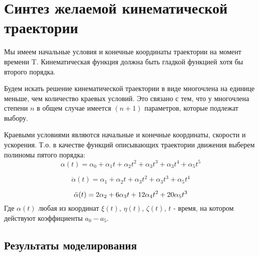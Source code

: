 \section{Синтез желаемой кинематической траектории}

Мы имеем начальные условия и конечные координаты траектории на момент времени T. Кинематическая функция должна быть гладкой функцией хотя бы второго порядка.

Будем искать решение кинематической траектории в виде многочлена на единице меньше, чем количество краевых условий. Это связано с тем, что у многочлена степени $n$ в общем случае имеется $(n + 1)$ параметров, которые подлежат выбору. 

Краевыми условиями являются начальные и конечные координаты, скорости и ускорения. Т.о. в качестве функций описывающих траектории движения выберем полиномы пятого порядка:
\begin{equation}
\alpha(t) = \alpha_0 + \alpha_1 t + \alpha_2 t^2 + \alpha_3 t^3 + \alpha_3 t^4 + \alpha_5 t^5 
\label{eq:ur_traectorii}
\end{equation}

\begin{equation}
\Dot{\alpha}(t) = \alpha_1 + \alpha_2 t + \alpha_3 t^2 + \alpha_3 t^3 + \alpha_5 t^4 
\label{eq:ur_velocity}
\end{equation}

\begin{equation}
\Ddot{\alpha}(t) = 2 \alpha_2 + 6 \alpha_3 t + 12 \alpha_4 t^2 + 20 \alpha_5 t^3
\end{equation}
Где $\alpha(t)$ любая из координат $\xi(t)$, $\eta(t)$, $\zeta(t)$, $t$ - время, на котором действуют коэффициенты $a_0-a_5$.
\clearpage
\subsection{Результаты моделирования}
\clearpage
